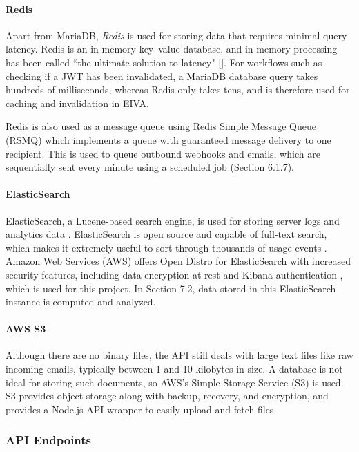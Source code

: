 \documentclass{article}
\begin{document}
\paragraph{Redis}

Apart from MariaDB, \emph{Redis} is used for storing data that requires minimal query latency. Redis is an in-memory key–value database, and in-memory processing has been called ``the ultimate solution to latency" []. For workflows such as checking if a JWT has been invalidated, a MariaDB database query takes hundreds of milliseconds, whereas Redis only takes tens, and is therefore used for caching and invalidation in EIVA.

Redis is also used as a message queue using Redis Simple Message Queue (RSMQ) which implements a queue with guaranteed message delivery to one recipient. This is used to queue outbound webhooks and emails, which are sequentially sent every minute using a scheduled job (Section 6.1.7).

\paragraph{ElasticSearch}

ElasticSearch, a Lucene-based search engine, is used for storing server logs and analytics data \cite{noauthor_elastic_nodate}. ElasticSearch is open source and capable of full-text search, which makes it extremely useful to sort through thousands of usage events \cite{noauthor_elastic/elasticsearch_2020}. Amazon Web Services (AWS) offers Open Distro for ElasticSearch with increased security features, including data encryption at rest and Kibana authentication \cite{noauthor_open_nodate}, which is used for this project. In Section 7.2, data stored in this ElasticSearch instance is computed and analyzed.

\paragraph{AWS S3}

Although there are no binary files, the API still deals with large text files like raw incoming emails, typically between 1 and 10 kilobytes in size. A database is not ideal for storing such documents, so AWS's Simple Storage Service (S3) is used. S3 provides object storage along with backup, recovery, and encryption, and provides a Node.js API wrapper to easily upload and fetch files.

\subsubsection{API Endpoints}
\end{document}
